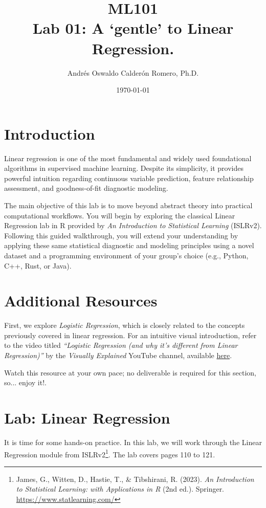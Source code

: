 \documentclass{article}
\title{ML101 \\ Lab 01: A `gentle' to Linear Regression.}
\author{Andrés Oswaldo Calderón Romero, Ph.D.}
\date{\today}
\begin{document}
\maketitle

\section{Introduction}
\label{sec:intro}

Linear regression is one of the most fundamental and widely used foundational algorithms in supervised machine learning. Despite its simplicity, it provides powerful intuition regarding continuous variable prediction, feature relationship assessment, and goodness-of-fit diagnostic modeling.

The main objective of this lab is to move beyond abstract theory into practical computational workflows. You will begin by exploring the classical Linear Regression lab in R provided by \textit{An Introduction to Statistical Learning} (ISLRv2). Following this guided walkthrough, you will extend your understanding by applying these same statistical diagnostic and modeling principles using a novel dataset and a programming environment of your group's choice (e.g., Python, C++, Rust, or Java).

\section{Additional Resources}
\label{sec:resources}

First, we explore \textit{Logistic Regression}, which is closely related to the concepts previously covered in linear regression. For an intuitive visual introduction, refer to the video titled \textit{``Logistic Regression (and why it's different from Linear Regression)''} by the \textit{Visually Explained} YouTube channel, available \href{https://youtu.be/3bvM3NyMiE0?si=kUwYNpsyWxoPzzPI}{here}.

Watch this resource at your own pace; no deliverable is required for this section, so... enjoy it!.

\section{Lab: Linear Regression}
\label{sec:lab}

It is time for some hands-on practice. In this lab, we will work through the Linear Regression module from ISLRv2\footnote{James, G., Witten, D., Hastie, T., \& Tibshirani, R. (2023). \textit{An Introduction to Statistical Learning: with Applications in R} (2nd ed.). Springer. \url{https://www.statlearning.com/}}. The lab covers pages 110 to 121.
\end{document}
